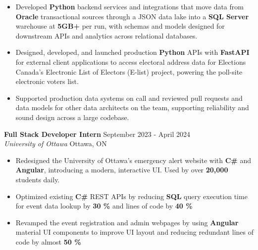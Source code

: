\documentclass[a4paper]{article}
\begin{document}
\begin{itemize}
\item Developed \textbf{Python} backend services and integrations that move data from \textbf{Oracle} transactional sources through a JSON data lake into a \textbf{SQL Server} warehouse at \textbf{5GB+} per run, with schemas and models designed for downstream APIs and analytics across relational databases.

\item Designed, developed, and launched production \textbf{Python} APIs with \textbf{FastAPI} for external client applications to access electoral address data for Elections Canada's Electronic List of Electors (E-list) project, powering the poll-site electronic voters list.

\item Supported production data systems on call and reviewed pull requests and data models for other data architects on the team, supporting reliability and sound design across a large codebase.

\end{itemize}

\textbf{Full Stack Developer Intern } \hfill September 2023 - April 2024\\
\textit{University of Ottawa} \hfill Ottawa, ON\\
\vspace{-2mm}
\begin{itemize} \itemsep -4pt
    \item Redesigned the University of Ottawa's emergency alert website with \textbf{C\#} and \textbf{Angular}, introducing a modern, interactive UI. Used by over \textbf{20,000} students daily.
     \item Optimized existing \textbf{C\#} REST APIs by reducing \textbf{SQL} query execution time for event data lookup by \textbf{30 \%} and lines of code by \textbf{40 \%}
    \item Revamped the event registration and admin webpages by using \textbf{Angular} material UI components to improve UI layout and reducing redundant lines of code by almost \textbf{50 \%}
\end{itemize}
\end{document}
